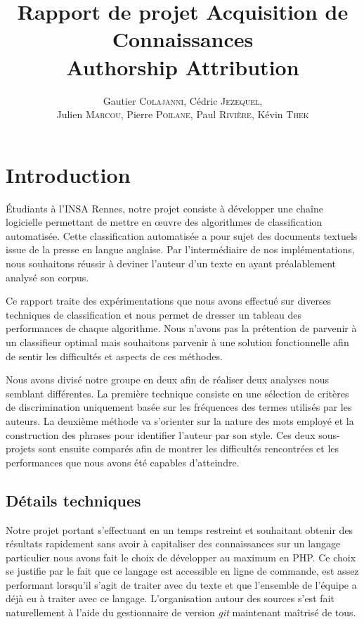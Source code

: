 \documentclass[a4paper,12pt]{report}
\author{Gautier \textsc{Colajanni}, Cédric \textsc{Jezequel},\\ Julien \textsc{Marcou}, Pierre \textsc{Poilane}, Paul \textsc{Rivière}, Kévin \textsc{Thek}}
\title{Rapport de projet Acquisition de Connaissances \\ Authorship Attribution}
\begin{document}


\newpage \thispagestyle{empty}
\null
\newpage 

\renewcommand\contentsname{Sommaire}
\tableofcontents


\section*{Introduction}

Étudiants à l'INSA Rennes, notre projet consiste à développer une chaîne logicielle permettant de mettre en œuvre des algorithmes de classification automatisée. Cette classification automatisée a pour sujet des documents textuels issue de la presse en langue anglaise. Par l'intermédiaire de nos implémentations, nous souhaitons réussir à deviner l'auteur d'un texte en ayant préalablement analysé son corpus.

Ce rapport traite des expérimentations que nous avons effectué sur diverses techniques de classification et nous permet de dresser un tableau des performances de chaque algorithme. Nous n'avons pas la prétention de parvenir à un classifieur optimal mais souhaitons parvenir à une solution fonctionnelle afin de sentir les difficultés et aspects de ces méthodes.

Nous avons divisé notre groupe en deux afin de réaliser deux analyses nous semblant différentes. La première technique consiste en une sélection de critères de discrimination uniquement basée sur les fréquences des termes utilisés par les auteurs. La deuxième méthode va s'orienter sur la nature des mots employé et la construction des phrases pour identifier l'auteur par son style. Ces deux sous-projets sont ensuite comparés afin de montrer les difficultés rencontrées et les performances que nous avons été capables d'atteindre.

\subsection*{Détails techniques}

Notre projet portant s'effectuant en un temps restreint et souhaitant obtenir des résultats rapidement sans avoir à capitaliser des connaissances sur un langage particulier nous avons fait le choix de développer au maximum en PHP. Ce choix se justifie par le fait que ce langage est accessible en ligne de commande, est assez performant lorsqu'il s'agit de traiter avec du texte et que l'ensemble de l'équipe a déjà eu à traiter avec ce langage. 
L'organisation autour des sources s'est fait naturellement à l'aide du gestionnaire de version \textit{git} maintenant maîtrisé de tous.
\end{document}
